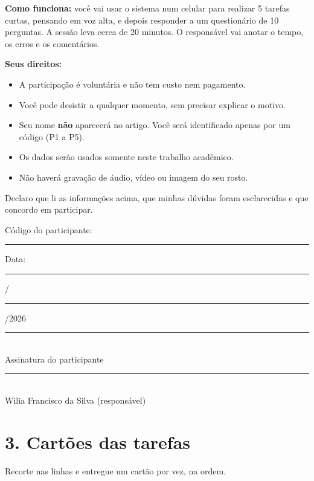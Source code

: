 \documentclass[a4paper,12pt]{article}
\newcommand{\linha}[1]{\rule{#1}{0.4pt}}
\begin{document}
\textbf{Como funciona:} você vai usar o sistema num celular para
realizar 5 tarefas curtas, pensando em voz alta, e depois responder a
um questionário de 10 perguntas. A sessão leva cerca de 20 minutos. O
responsável vai anotar o tempo, os erros e os comentários.

\textbf{Seus direitos:}
\begin{itemize}[leftmargin=1cm]
  \item A participação é voluntária e não tem custo nem pagamento.
  \item Você pode desistir a qualquer momento, sem precisar explicar o motivo.
  \item Seu nome \textbf{não} aparecerá no artigo. Você será identificado
    apenas por um código (P1 a P5).
  \item Os dados serão usados somente neste trabalho acadêmico.
  \item Não haverá gravação de áudio, vídeo ou imagem do seu rosto.
\end{itemize}

Declaro que li as informações acima, que minhas dúvidas foram
esclarecidas e que concordo em participar.

\vspace{1.2cm}

Código do participante: \linha{2cm} \hfill Data: \linha{1cm}/\linha{1cm}/2026

\vspace{1.4cm}

\linha{8cm}\\
Assinatura do participante

\vspace{1.2cm}

\linha{8cm}\\
Wilia Francisco da Silva (responsável)

\newpage
\section*{3. Cartões das tarefas}

{\small Recorte nas linhas e entregue um cartão por vez, na ordem.}

\newcommand{\cartao}[2]{%
  \noindent\fbox{\parbox{\dimexpr\linewidth-2\fboxsep-2\fboxrule}{%
    \vspace{6pt}{\large\bfseries Tarefa #1}\\[6pt]
    {\large #2}\vspace{8pt}}}\par\vspace{10pt}}
\end{document}
